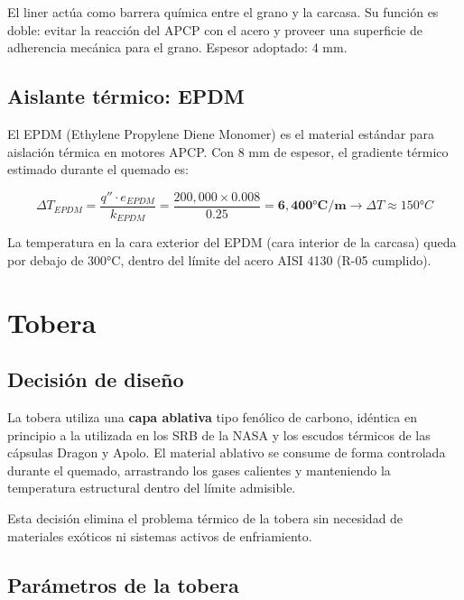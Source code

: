 \documentclass[11pt, a4paper]{article}
\begin{document}
El liner act\'{u}a como barrera qu\'{i}mica entre el grano y la carcasa. Su funci\'{o}n es doble: evitar la reacci\'{o}n del APCP con el acero y proveer una superficie de adherencia mec\'{a}nica para el grano. Espesor adoptado: 4 mm.

\subsection{Aislante t\'{e}rmico: EPDM}

El EPDM (Ethylene Propylene Diene Monomer) es el material est\'{a}ndar para aislaci\'{o}n t\'{e}rmica en motores APCP. Con 8 mm de espesor, el gradiente t\'{e}rmico estimado durante el quemado es:

\begin{equation}
  \Delta T_{EPDM} = \frac{q'' \cdot e_{EPDM}}{k_{EPDM}}
  = \frac{200{,}000 \times 0.008}{0.25}
  = \mathbf{6{,}400°C/m} \rightarrow \Delta T \approx 150°C
\end{equation}

La temperatura en la cara exterior del EPDM (cara interior de la carcasa) queda por debajo de 300°C, dentro del l\'{i}mite del acero AISI 4130 (R-05 cumplido).

\section{Tobera}

\subsection{Decisi\'{o}n de dise\~{n}o}

La tobera utiliza una \textbf{capa ablativa} tipo fen\'{o}lico de carbono, id\'{e}ntica en principio a la utilizada en los SRB de la NASA y los escudos t\'{e}rmicos de las c\'{a}psulas Dragon y Apolo. El material ablativo se consume de forma controlada durante el quemado, arrastrando los gases calientes y manteniendo la temperatura estructural dentro del l\'{i}mite admisible.

Esta decisi\'{o}n elimina el problema t\'{e}rmico de la tobera sin necesidad de materiales ex\'{o}ticos ni sistemas activos de enfriamiento.

\subsection{Par\'{a}metros de la tobera}
\end{document}

